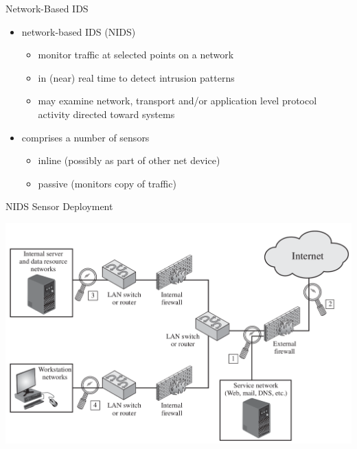\documentclass{beamer}
\begin{document}
\begin{frame}{Network-Based IDS}
  \begin{itemize}
  \item network-based IDS (NIDS) 
    \begin{itemize}
    \item monitor traffic at selected points on a network 
    \item in (near) real time to detect intrusion patterns 
    \item may examine network, transport and/or application 
      level protocol activity directed toward systems 
    \end{itemize}
  \item comprises a number of sensors 
    \begin{itemize}
    \item inline (possibly as part of other net device) 
    \item passive (monitors copy of traffic)
    \end{itemize}
  \end{itemize}
\end{frame}

\begin{frame}{NIDS Sensor Deployment}
   \begin{center}
    \includegraphics[width=0.9\linewidth]{net}
  \end{center}
\end{frame}
\end{document}
